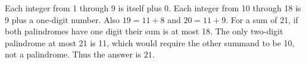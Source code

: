 Each integer from 1 through 9 is itself plus 0. Each integer from 10 through 18 is 9 plus a one-digit number. Also $19=11+8$ and $20=11+9$. For a sum of 21, if both palindromes have one digit their sum is at most 18. The only two-digit palindrome at most 21 is 11, which would require the other summand to be 10, not a palindrome. Thus the answer is $\boxed{21}$.
